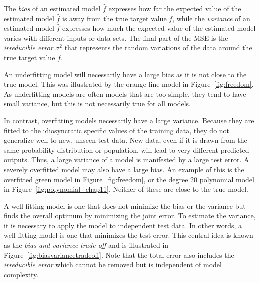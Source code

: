 The \emph{bias} of an estimated model $\hat{f}$ expresses how far the expected value of the estimated model $\hat{f}$ is away from the true target value $f$, while the \emph{variance} of an estimated model $\hat{f}$ expresses how much the expected value of the estimated model varies with different inputs or data sets. The final part of the MSE is the \emph{irreducible error} $\sigma^2$ that represents the random variations of the data around the true target value $f$.

An underfitting model will necessarily have a large bias as it is not close to the true model. This was illustrated by the orange line model in Figure~\ref{fig:freedom}. As underfitting models are often models that are too simple, they tend to have small variance, but this is not necessarily true for all models. 

In contrast, overfitting models necessarily have a large variance. Because they are fitted to the idiosyncratic specific values of the training data, they do not generalize well to new, unseen test data. New data, even if it is drawn from the same probability distribution or population, will lead to very different predicted outputs. Thus, a large variance of a model is manifested by a large test error. A severely overfitted model may also have a large bias. An example of this is the overfitted green model in Figure~\ref{fig:freedom}, or the degree 20 polynomial model in Figure~\ref{fig:polynomial_chap11}. Neither of these are close to the true model. 

A well-fitting model is one that does not minimize the bias or the variance but finds the overall optimum by minimizing the joint error. To estimate the variance, it is necessary to apply the model to independent test data. In other words, a well-fitting model is one that minimizes the test error. This central idea is known as the \emph{bias and variance trade-off} and is illustrated in Figure~\ref{fig:biasvariancetradeoff}. Note that the total error also includes the \emph{irreducible error} which cannot be removed but is independent of model complexity.


